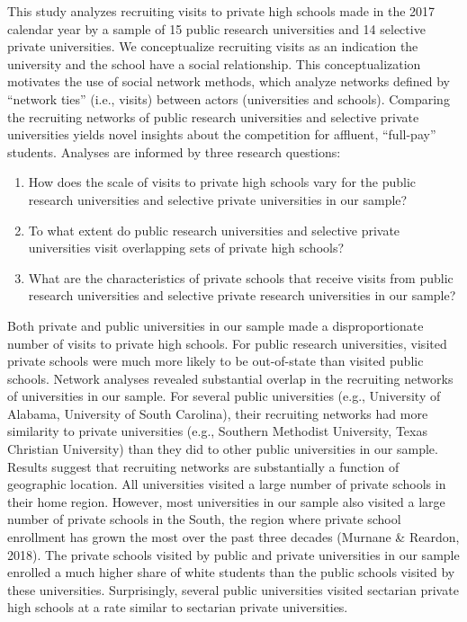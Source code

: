 \documentclass[
  12pt,
]{article}
\providecommand{\tightlist}{%
  \setlength{\itemsep}{0pt}\setlength{\parskip}{0pt}}
\begin{document}
This study analyzes recruiting visits to private high schools made in the 2017 calendar year by a sample of 15 public research universities and 14 selective private universities. We conceptualize recruiting visits as an indication the university and the school have a social relationship. This conceptualization motivates the use of social network methods, which analyze networks defined by ``network ties'' (i.e., visits) between actors (universities and schools). Comparing the recruiting networks of public research universities and selective private universities yields novel insights about the competition for affluent, ``full-pay'' students. Analyses are informed by three research questions:

\begin{enumerate}
\def\labelenumi{\arabic{enumi}.}
\tightlist
\item
  How does the scale of visits to private high schools vary for the public research universities and selective private universities in our sample?
\item
  To what extent do public research universities and selective private universities visit overlapping sets of private high schools?
\item
  What are the characteristics of private schools that receive visits from public research universities and selective private research universities in our sample?
\end{enumerate}

Both private and public universities in our sample made a disproportionate number of visits to private high schools. For public research universities, visited private schools were much more likely to be out-of-state than visited public schools. Network analyses revealed substantial overlap in the recruiting networks of universities in our sample. For several public universities (e.g., University of Alabama, University of South Carolina), their recruiting networks had more similarity to private universities (e.g., Southern Methodist University, Texas Christian University) than they did to other public universities in our sample. Results suggest that recruiting networks are substantially a function of geographic location. All universities visited a large number of private schools in their home region. However, most universities in our sample also visited a large number of private schools in the South, the region where private school enrollment has grown the most over the past three decades (Murnane \& Reardon, 2018). The private schools visited by public and private universities in our sample enrolled a much higher share of white students than the public schools visited by these universities. Surprisingly, several public universities visited sectarian private high schools at a rate similar to sectarian private universities.
\end{document}
